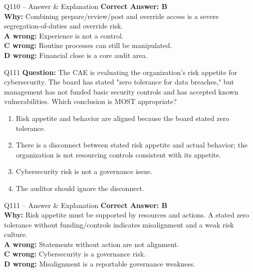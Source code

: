 \documentclass[aspectratio=169,10pt]{beamer}
\begin{document}
	\begin{frame}[t]{Q110 -- Answer \& Explanation}
		\small
		\textbf{Correct Answer: B} \\[4pt]
		\textbf{Why:} Combining prepare/review/post and override access is a severe segregation-of-duties and override risk. \\[4pt]
		\textbf{A wrong:} Experience is not a control. \\[2pt]
		\textbf{C wrong:} Routine processes can still be manipulated. \\[2pt]
		\textbf{D wrong:} Financial close is a core audit area.
	\end{frame}
	
	\begin{frame}[t]{Q111}
		\small
		\textbf{Question:} The CAE is evaluating the organization's risk appetite for cybersecurity. The board has stated "zero tolerance for data breaches," but management has not funded basic security controls and has accepted known vulnerabilities. Which conclusion is MOST appropriate?
		\begin{enumerate}[label=\Alph*.,itemsep=1pt,topsep=2pt]
			\item Risk appetite and behavior are aligned because the board stated zero tolerance.
			\item There is a disconnect between stated risk appetite and actual behavior; the organization is not resourcing controls consistent with its appetite.
			\item Cybersecurity risk is not a governance issue.
			\item The auditor should ignore the disconnect.
		\end{enumerate}
	\end{frame}
	
	\begin{frame}[t]{Q111 -- Answer \& Explanation}
		\small
		\textbf{Correct Answer: B} \\[4pt]
		\textbf{Why:} Risk appetite must be supported by resources and actions. A stated zero tolerance without funding/controls indicates misalignment and a weak risk culture. \\[4pt]
		\textbf{A wrong:} Statements without action are not alignment. \\[2pt]
		\textbf{C wrong:} Cybersecurity is a governance risk. \\[2pt]
		\textbf{D wrong:} Misalignment is a reportable governance weakness.
	\end{frame}
	
\end{document}
